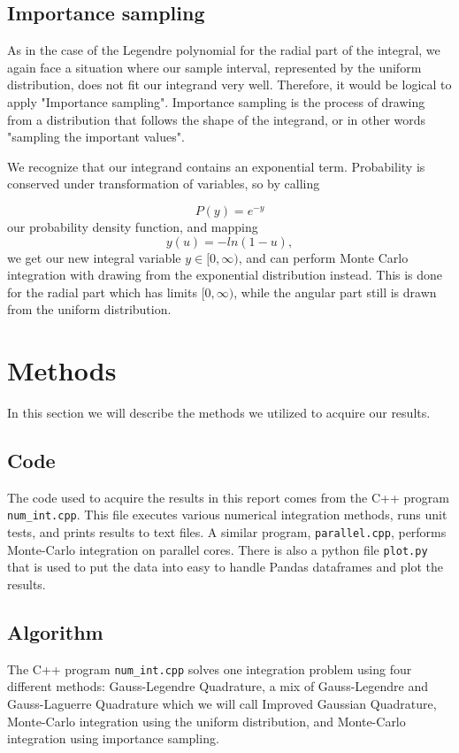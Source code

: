 \documentclass{emulateapj}
\begin{document}
\subsection{Importance sampling}
As in the case of the Legendre polynomial for the radial part of the integral, we again face a situation where our sample interval, represented by the uniform distribution, does not fit our integrand very well. Therefore, it would be logical to apply "Importance sampling". Importance sampling is the process of drawing from a distribution that follows the shape of the integrand, or in other words "sampling the important values".

We recognize that our integrand contains an exponential term. Probability is conserved under transformation of variables, so by calling

\begin{equation}
    P(y) = e^{-y}
\end{equation}
our probability density function, and mapping
\begin{equation}
    y(u) = -ln\left(1-u\right),
\end{equation}
we get our new integral variable $y\in [0,\infty)$, and can perform Monte Carlo integration with drawing from the exponential distribution instead. This is done for the radial part which has limits $[0,\infty)$, while the angular part still is drawn from the uniform distribution.

\section{Methods}
\label{sec:methods}
In this section we will describe the methods we utilized to acquire our results.
\subsection{Code}
The code used to acquire the results in this report comes from the C++ program \texttt{num\_int.cpp}. This file executes various numerical integration methods, runs unit tests, and prints results to text files. A similar program, \texttt{parallel.cpp}, performs Monte-Carlo integration on parallel cores. There is also a python file \texttt{plot.py} that is used to put the data into easy to handle Pandas dataframes and plot the results.

\subsection{Algorithm}
The C++ program \texttt{num\_int.cpp} solves one integration problem using four different methods: Gauss-Legendre Quadrature, a mix of Gauss-Legendre and Gauss-Laguerre Quadrature which we will call Improved Gaussian Quadrature, Monte-Carlo integration using the uniform distribution, and Monte-Carlo integration using importance sampling.
\end{document}
